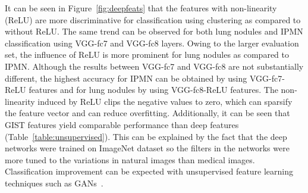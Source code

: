 \documentclass[journal]{IEEEtran}
\begin{document}
It can be seen in Figure~\ref{fig:deepfeats} that the features with non-linearity (ReLU) are more discriminative for classification using clustering as compared to without ReLU. The same trend can be observed for both lung nodules and IPMN classification using VGG-fc7 and VGG-fc8 layers. Owing to the larger evaluation set, the influence of ReLU is more prominent for lung nodules as compared to IPMN. Although the results between VGG-fc7 and VGG-fc8 are not substantially different, the highest accuracy for IPMN can be obtained by using VGG-fc7-ReLU features and for lung nodules by using VGG-fc8-ReLU features. The non-linearity induced by ReLU clips the negative values to zero, which can sparsify the feature vector and can reduce overfitting. Additionally, it can be seen that GIST features yield comparable performance than deep features (Table~\ref{table:unsupervised}). This can be explained by the fact that the deep networks were trained on ImageNet dataset so the filters in the networks were more tuned to the variations in natural images than medical images. Classification improvement can be expected with unsupervised feature learning techniques such as GANs~\cite{radford2015unsupervised}.\\
\end{document}
